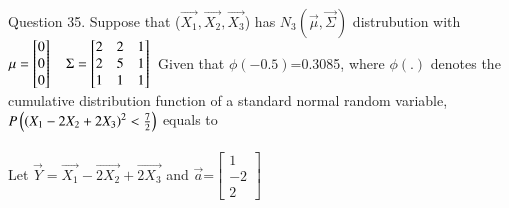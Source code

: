 \documentclass[journal,12pt,twocolumn]{IEEEtran}
\begin{document}



%
Question 35.
Suppose that ($\vec{X_1},\vec{X_2},\vec{X_3}$) has $N_3(\vec{\mu},\vec{\Sigma})$ distrubution with 
$\mu = \begin{bmatrix}
0 \\
0\\
0
\end{bmatrix} \quad  
\Sigma=\begin{bmatrix}
2 & 2 & 1 \\
2 & 5 & 1 \\
1 & 1 & 1
\end{bmatrix} \\ $ Given that $\phi(-0.5)$=0.3085, where $\phi(.)$ denotes the cumulative distribution function of a standard normal random variable, $P \left( \left(X_1-2X_2+2X_3\right)^2 < \frac{7}{2} \right)$ equals to \\
\solution \\
Let $\vec{Y} = \vec{X_1}-\vec{2X_2}+\vec{2X_3}$ and $\vec{a}$=$ \begin{bmatrix}
1 \\ -2 \\  2 
\end{bmatrix}$
\end{document}
